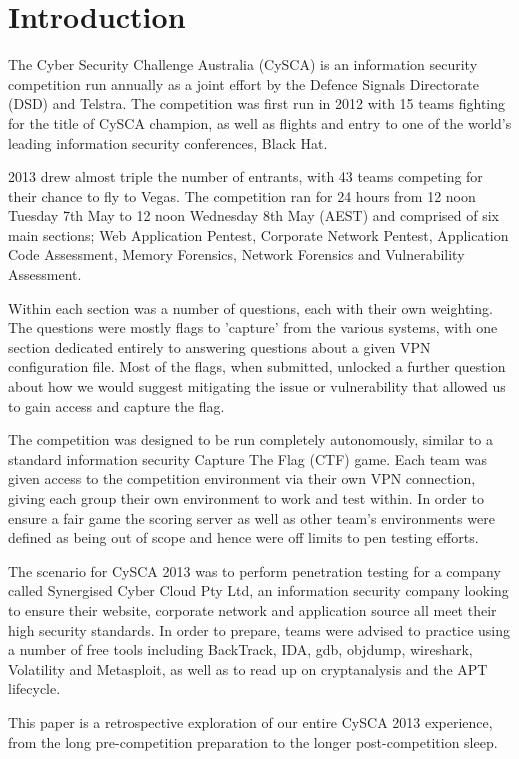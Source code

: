 \chapter{Introduction}

The Cyber Security Challenge Australia (CySCA) is an information security
competition run annually as a joint effort by the Defence Signals Directorate
(DSD) and Telstra. The competition was first run in 2012 with 15 teams fighting
for the title of CySCA champion, as well as flights and entry to one of the
world's leading information security conferences, Black Hat.

2013 drew almost triple the number of entrants, with 43 teams competing for
their chance to fly to Vegas.  The competition ran for 24 hours from 12 noon
Tuesday 7th May to 12 noon Wednesday 8th May  (AEST) and comprised of six main
sections; Web Application Pentest, Corporate Network Pentest, Application Code
Assessment, Memory Forensics, Network Forensics and Vulnerability Assessment.

Within each section was a number of questions, each with their own weighting.
The questions were mostly flags to 'capture' from the various systems, with one
section dedicated entirely to answering questions about a given VPN
configuration file.  Most of the flags, when submitted, unlocked a further
question about how we would suggest mitigating the issue or vulnerability that
allowed us to gain access and capture the flag.

The competition was designed to be run completely autonomously, similar to a
standard information security Capture The Flag (CTF) game. Each team was given
access to the competition environment via their own VPN connection, giving each
group their own environment to work and test within. In order to ensure a fair
game the scoring server as well as other team's environments were defined as
being out of scope and hence were off limits to pen testing efforts.

The scenario for CySCA 2013 was to perform penetration testing for a company
called Synergised Cyber Cloud Pty Ltd, an information security company looking
to ensure their website, corporate network and application source all meet their
high security standards. In order to prepare, teams were advised to practice
using a number of free tools including BackTrack, IDA, gdb, objdump, wireshark,
Volatility and Metasploit, as well as to read up on cryptanalysis and the APT
lifecycle.

This paper is a retrospective exploration of our entire CySCA 2013 experience,
from the long pre-competition preparation to the longer post-competition sleep.
